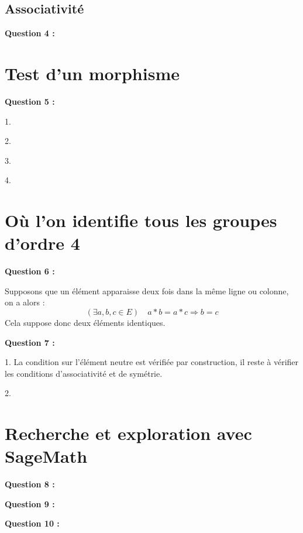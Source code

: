 \documentclass[titlepage]{article}
\begin{document}
        \subsection{Associativité}
        \textbf{Question 4 :}
    \section{Test d'un morphisme}
    \textbf{Question 5 :}

    1.

    2.

    3.

    4.
    \section{Où l’on identifie tous les groupes d’ordre 4}
    \textbf{Question 6 :}

    Supposons que un élément apparaisse deux fois dans la même ligne ou colonne, on a alors :
    \[(\exists a, b, c \in E) \quad a*b=a*c \Longrightarrow b = c\]
    Cela suppose donc deux éléments identiques.

    \textbf{Question 7 :}

    1. La condition sur l'élément neutre est vérifiée par construction, il reste à vérifier les conditions d'associativité et de symétrie.

    2.
    \section{Recherche et exploration avec SageMath}
    \textbf{Question 8 :}

    \textbf{Question 9 :}

    \textbf{Question 10 :}
\end{document}
